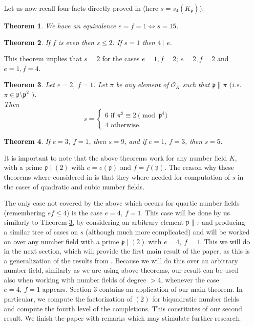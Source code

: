 \documentclass[12pt]{article}
\newtheorem{thm}{Theorem}[section]
\theoremstyle{remark}
\newcommand{\p}{\mathfrak{p}}
\begin{document}
Let us now recall four facts directly proved in \cite{paper-per-piotr} (here $s=s_4(K_\p)$).
\begin{thm}\label{1.1} 
We have an equivalence  $e=f=1 \iff s=15$. 
\end{thm}


\begin{thm}\label{1.2} 
 If $f$ is even then $s \leq 2$. If $s=1$ then $4 \mid e$. 

\end{thm}
This theorem implies that $s=2$ for the cases $e=1, f=2$; $e=2, f=2$ and $e=1, f=4$.


\begin{thm}\label{1.3} 
 Let $e=2,\ f=1$. Let $\pi$ be any element of $\mathcal{O}_K $ such that $\mathfrak{p} \parallel \pi$ $($i.e. $\pi \in \mathfrak{p} \setminus \mathfrak{p}^2$ $)$. \\
Then $$s = \begin{cases}
    6 \text{ if } \pi^2 \equiv 2 \pmod{\mathfrak{p}^4}\\
    4 \text{ otherwise.}
\end{cases} $$
\end{thm}

\begin{thm}\label{1.4}
If $e = 3,\ f=1$, then $s=9$, and if $e=1, \ f=3$, then $s=5$.
    
\end{thm}

It is important to note that the above theorems work for any number field $K$, with a prime $\p \mid (2)$ with $e = e(\p)$ and $f = f(\p)$. The reason why these theorems where considered in \cite{paper-per-piotr} is that they where needed for computation of $s$ in the cases of quadratic and cubic number fields.

The only case not covered by the above which occurs for quartic number fields (remembering $ef \leq 4$) is the case $e = 4, \ f=1$. This case will be done by us similarly to Theorem \ref{1.3}, by considering an arbitrary element $\p \parallel \tau $ and producing a similar tree of cases on $s$ (although much more complicated) and will be worked on over any number field with a prime $\p \mid (2)$ with $e=4, \ f=1$. This we will do in the next section, which will provide the first main result of the paper, as this is a generalization of the results from \cite{paper-per-piotr}. Because we will do this over an arbitrary number field, similarly as we are using above theorems, our result can be used also when working with number fields of degree $>4$, whenever the case $e=4, \ f=1$ appears. Section 3 contains an application of our main theorem. In particular, we compute the factorization of $(2)$ for biquadratic number fields and compute the fourth level of the completions. This constitutes of our second result. We finish the paper with remarks which may stimulate further research.
\end{document}
